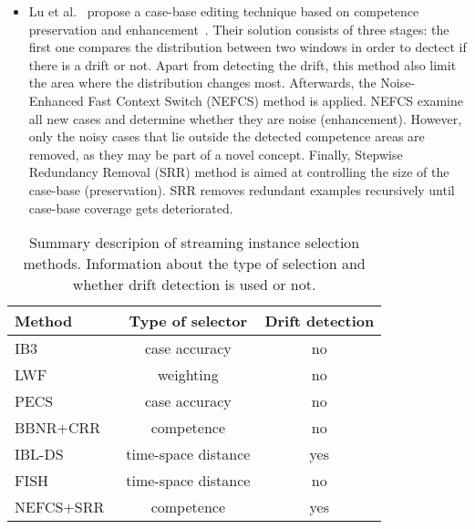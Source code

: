\documentclass[preprint,12pt]{elsarticle}
\begin{document}
\begin{itemize}
	\item Lu et al.~\cite{lu16} propose a case-base editing technique based on competence preservation and enhancement~\cite{smyth95}. Their solution consists of three stages: the first one compares the distribution between two windows in order to dectect if there is a drift or not. Apart from detecting the drift, this method also limit the area where the distribution changes most. Afterwards, the Noise-Enhanced Fast Context Switch (NEFCS) method is applied. NEFCS examine all new cases and determine whether they are noise (enhancement). However, only the noisy cases that lie outside the detected competence areas are removed, as they may be part of a novel concept. Finally, Stepwise Redundancy Removal (SRR) method is aimed at controlling the size of the case-base (preservation). SRR removes redundant examples recursively until case-base coverage gets deteriorated.

\end{itemize}


\begin{table}[!htp]
\renewcommand{\arraystretch}{1.3}
\centering
\scriptsize
\caption{Summary descripion of streaming instance selection methods. Information about the type of selection and whether drift detection is used or not.}
\label{tab:fs}
\begin{tabular}{ lcc }
\toprule
{\bf Method} & {\bf Type of selector} & {\bf Drift detection}\\
\midrule
IB3~\cite{aha91} & case accuracy & no\\
LWF~\cite{salga93} & weighting & no\\
PECS~\cite{salga97} & case accuracy & no\\
BBNR+CRR~\cite{masud10} & competence & no\\
IBL-DS~\cite{berin07} & time-space distance & yes\\
FISH~\cite{gomes14} & time-space distance & no\\
NEFCS+SRR~\cite{lu16} & competence & yes\\
\bottomrule
\end{tabular}
\end{table}
\end{document}
